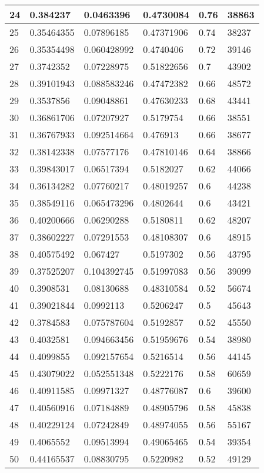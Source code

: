 \begin{longtable}{|l|l|l|l|l|l|}
24 & 0.384237 & 0.0463396 & 0.4730084 & 0.76 & 38863 \\ \hline 
25 & 0.35464355 & 0.07896185 & 0.47371906 & 0.74 & 38237 \\ \hline 
26 & 0.35354498 & 0.060428992 & 0.4740406 & 0.72 & 39146 \\ \hline 
27 & 0.3742352 & 0.07228975 & 0.51822656 & 0.7 & 43902 \\ \hline 
28 & 0.39101943 & 0.088583246 & 0.47472382 & 0.66 & 48572 \\ \hline 
29 & 0.3537856 & 0.09048861 & 0.47630233 & 0.68 & 43441 \\ \hline 
30 & 0.36861706 & 0.07207927 & 0.5179754 & 0.66 & 38551 \\ \hline 
31 & 0.36767933 & 0.092514664 & 0.476913 & 0.66 & 38677 \\ \hline 
32 & 0.38142338 & 0.07577176 & 0.47810146 & 0.64 & 38866 \\ \hline 
33 & 0.39843017 & 0.06517394 & 0.5182027 & 0.62 & 44066 \\ \hline 
34 & 0.36134282 & 0.07760217 & 0.48019257 & 0.6 & 44238 \\ \hline 
35 & 0.38549116 & 0.065473296 & 0.4802644 & 0.6 & 43421 \\ \hline 
36 & 0.40200666 & 0.06290288 & 0.5180811 & 0.62 & 48207 \\ \hline 
37 & 0.38602227 & 0.07291553 & 0.48108307 & 0.6 & 48915 \\ \hline 
38 & 0.40575492 & 0.067427 & 0.5197302 & 0.56 & 43795 \\ \hline 
39 & 0.37525207 & 0.104392745 & 0.51997083 & 0.56 & 39099 \\ \hline 
40 & 0.3908531 & 0.08130688 & 0.48310584 & 0.52 & 56674 \\ \hline 
41 & 0.39021844 & 0.0992113 & 0.5206247 & 0.5 & 45643 \\ \hline 
42 & 0.3784583 & 0.075787604 & 0.5192857 & 0.52 & 45550 \\ \hline 
43 & 0.4032581 & 0.094663456 & 0.51959676 & 0.54 & 38980 \\ \hline 
44 & 0.4099855 & 0.092157654 & 0.5216514 & 0.56 & 44145 \\ \hline 
45 & 0.43079022 & 0.052551348 & 0.5222176 & 0.58 & 60659 \\ \hline 
46 & 0.40911585 & 0.09971327 & 0.48776087 & 0.6 & 39600 \\ \hline 
47 & 0.40560916 & 0.07184889 & 0.48905796 & 0.58 & 45838 \\ \hline 
48 & 0.40229124 & 0.07242849 & 0.48974055 & 0.56 & 55167 \\ \hline 
49 & 0.4065552 & 0.09513994 & 0.49065465 & 0.54 & 39354 \\ \hline 
50 & 0.44165537 & 0.08830795 & 0.5220982 & 0.52 & 49129 \\ \hline 
\end{longtable}
